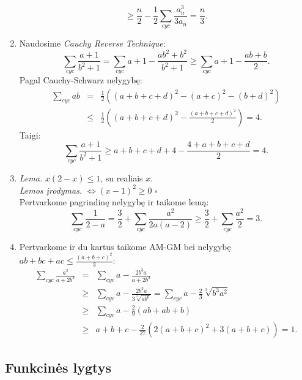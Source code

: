 \begin{enumerate}
$$    \geq\frac{n}{2}-\frac{1}{2}\sum_{cyc}{\frac{a_n^3}{3a_n}}=\frac{n}{3}.$$
\item
    Naudosime \textit{Cauchy Reverse Technique}:
    $$\sum_{cyc}{\frac{a+1}{b^2+1}}=\sum_{cyc}{a+1-\frac{ab^2+b^2}{b^2+1}}\geq\sum_{cyc}{a+1-\frac{ab+b}{2}}.$$
    Pagal Cauchy-Schwarz nelygybę:
    \begin{eqnarray*}\sum_{cyc}{ab}&=&\frac{1}{2}((a+b+c+d)^2-(a+c)^2-(b+d)^2)\\
    &\leq&
    \frac{1}{2}((a+b+c+d)^2-\frac{(a+b+c+d)^2}{2})=4.\end{eqnarray*}
    Taigi: $$\sum_{cyc}{\frac{a+1}{b^2+1}}\geq
    a+b+c+d+4-\frac{4+a+b+c+d}{2}=4.$$
\item
    \textit{Lema.} $x(2-x)\leq1$, su realiais $x$. \\ \noindent\textit{Lemos
    įrodymas.} $\Leftrightarrow (x-1)^2\geq0$ \hfill{$\square$}
    \\Pertvarkome pagrindinę nelygybę ir taikome lemą:
    $$\sum_{cyc}{\frac{1}{2-a}}=\frac{3}{2}+\sum_{cyc}{\frac{a^2}{2a(a-2)}}\geq\frac{3}{2}+\sum_{cyc}{\frac{a^2}{2}}=3.$$
\item
    Pertvarkome ir du kartus taikome AM-GM bei nelygybę
    $ab+bc+ac\leq\frac{(a+b+c)^2}{3}$:
    \begin{eqnarray*}\sum_{cyc}{\frac{a^2}{a+2b^3}}&=&\sum_{cyc}{a-\frac{2b^3a}{a+2b^3}}\\
    &\geq&\sum_{cyc}{a-\frac{2b^3a}{3\sqrt[3]{ab^6}}}=\sum_{cyc}{a-\frac{2}{3}\sqrt[3]{b^3a^2}}\\&\geq&\sum_{cyc}{a-\frac{2}{9}(ab+ab+b)}\\
    &\geq&a+b+c-\frac{2}{27}\left(2(a+b+c)^2+3(a+b+c)\right)=1.\end{eqnarray*}
\end{enumerate} 
\subsection*{Funkcinės lygtys}
